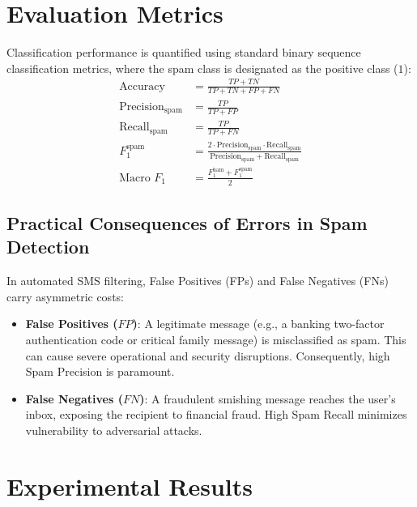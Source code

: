 \documentclass[conference]{IEEEtran}
\begin{document}
\section{Evaluation Metrics}
\label{sec:metrics}

Classification performance is quantified using standard binary sequence classification metrics, where the spam class is designated as the positive class ($1$):
\begin{align}
\text{Accuracy} &= \frac{TP + TN}{TP + TN + FP + FN} \\
\text{Precision}_{\text{spam}} &= \frac{TP}{TP + FP} \\
\text{Recall}_{\text{spam}} &= \frac{TP}{TP + FN} \\
F_1^{\text{spam}} &= \frac{2 \cdot \text{Precision}_{\text{spam}} \cdot \text{Recall}_{\text{spam}}}{\text{Precision}_{\text{spam}} + \text{Recall}_{\text{spam}}} \\
\text{Macro } F_1 &= \frac{F_1^{\text{ham}} + F_1^{\text{spam}}}{2}
\end{align}

\subsection{Practical Consequences of Errors in Spam Detection}
In automated SMS filtering, False Positives (FPs) and False Negatives (FNs) carry asymmetric costs:
\begin{itemize}
    \item \textbf{False Positives ($FP$)}: A legitimate message (e.g., a banking two-factor authentication code or critical family message) is misclassified as spam. This can cause severe operational and security disruptions. Consequently, high Spam Precision is paramount.
    \item \textbf{False Negatives ($FN$)}: A fraudulent smishing message reaches the user's inbox, exposing the recipient to financial fraud. High Spam Recall minimizes vulnerability to adversarial attacks.
\end{itemize}

\section{Experimental Results}
\label{sec:results}
\end{document}
